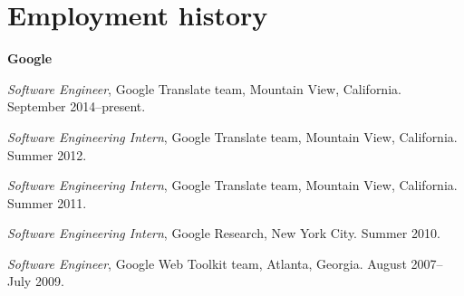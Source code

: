 \section*{Employment history}

\begin{itemize*}
\item{\textbf{Google}}
  \begin{itemize*}
  \item \textit{Software Engineer}, Google Translate team, Mountain View,
  California. September 2014--present.
  \item \textit{Software Engineering Intern}, Google Translate team, Mountain
  View, California. Summer 2012.
  \item \textit{Software Engineering Intern}, Google Translate team, Mountain
  View, California. Summer 2011.
  \item \textit{Software Engineering Intern}, Google Research, New York City.
  Summer 2010.
  \item \textit{Software Engineer}, Google Web Toolkit team, Atlanta, Georgia.
  August 2007--July 2009.
  \end{itemize*}
\end{itemize*}

